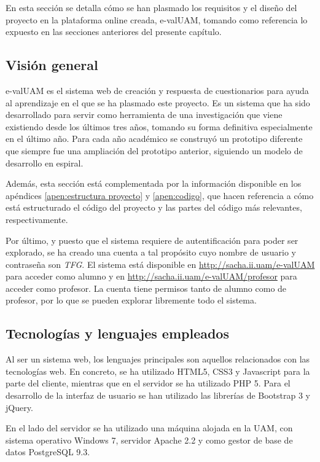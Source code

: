 En esta sección se detalla cómo se han plasmado los requisitos y el diseño del proyecto en la plataforma online creada, e-valUAM, tomando como referencia lo expuesto en las secciones anteriores del presente capítulo.

\subsection{Visión general}

e-valUAM es el sistema web de creación y respuesta de cuestionarios para ayuda al aprendizaje en el que se ha plasmado este proyecto. Es un sistema que ha sido desarrollado para servir como herramienta de una investigación que viene existiendo desde los últimos tres años, tomando su forma definitiva especialmente en el último año. Para cada año académico se construyó un prototipo diferente que siempre fue una ampliación del prototipo anterior, siguiendo un modelo de desarrollo en espiral.

Además, esta sección está complementada por la información disponible en los apéndices \ref{apen:estructura proyecto} y \ref{apen:codigo}, que hacen referencia a cómo está estructurado el código del proyecto y las partes del código más relevantes, respectivamente.

Por último, y puesto que el sistema requiere de autentificación para poder ser explorado, se ha creado una cuenta a tal propósito cuyo nombre de usuario y contraseña son \textit{TFG}. El sistema está disponible en \url{http://sacha.ii.uam/e-valUAM} para acceder como alumno y en \url{http://sacha.ii.uam/e-valUAM/profesor} para acceder como profesor. La cuenta tiene permisos tanto de alumno como de profesor, por lo que se pueden explorar libremente todo el sistema.

\subsection{Tecnologías y lenguajes empleados\label{sec:tecnologias}}

Al ser un sistema web, los lenguajes principales son aquellos relacionados con las tecnologías web. En concreto, se ha utilizado HTML5, CSS3 y Javascript para la parte del cliente, mientras que en el servidor se ha utilizado PHP 5. Para el desarrollo de la interfaz de usuario se han utilizado las librerías de Bootstrap 3 y jQuery.

En el lado del servidor se ha utilizado una máquina alojada en la UAM, con sistema operativo Windows 7, servidor Apache 2.2 y como gestor de base de datos PostgreSQL 9.3.

